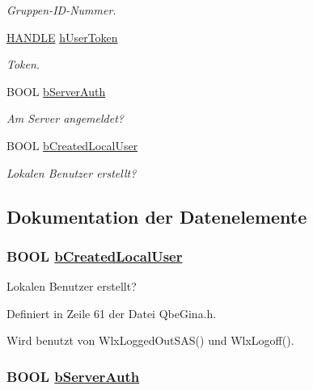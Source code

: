 \begin{CompactItemize}
\begin{CompactList}\small\item\em Gruppen-ID-Nummer. \item\end{CompactList}\item 
\hyperlink{QbeGina_8h_a0}{HANDLE} \hyperlink{structQbeGina__AccountInfo_QbeGina__AccountInfoo6}{h\-User\-Token}
\begin{CompactList}\small\item\em Token. \item\end{CompactList}\item 
BOOL \hyperlink{structQbeGina__AccountInfo_QbeGina__AccountInfoo7}{b\-Server\-Auth}
\begin{CompactList}\small\item\em Am Server angemeldet? \item\end{CompactList}\item 
BOOL \hyperlink{structQbeGina__AccountInfo_QbeGina__AccountInfoo8}{b\-Created\-Local\-User}
\begin{CompactList}\small\item\em Lokalen Benutzer erstellt? \item\end{CompactList}\end{CompactItemize}


\subsection{Dokumentation der Datenelemente}
\hypertarget{structQbeGina__AccountInfo_QbeGina__AccountInfoo8}{
\subsubsection[bCreatedLocalUser]{\setlength{\rightskip}{0pt plus 5cm}BOOL \hyperlink{structQbeGina__AccountInfo_QbeGina__AccountInfoo8}{b\-Created\-Local\-User}}}
\label{structQbeGina__AccountInfo_QbeGina__AccountInfoo8}


Lokalen Benutzer erstellt? 



Definiert in Zeile 61 der Datei Qbe\-Gina.h.

Wird benutzt von Wlx\-Logged\-Out\-SAS() und Wlx\-Logoff().\hypertarget{structQbeGina__AccountInfo_QbeGina__AccountInfoo7}{
\subsubsection[bServerAuth]{\setlength{\rightskip}{0pt plus 5cm}BOOL \hyperlink{structQbeGina__AccountInfo_QbeGina__AccountInfoo7}{b\-Server\-Auth}}}
\label{structQbeGina__AccountInfo_QbeGina__AccountInfoo7}


